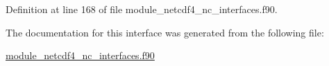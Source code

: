Definition at line 168 of file module\+\_\+netcdf4\+\_\+nc\+\_\+interfaces.\+f90.



The documentation for this interface was generated from the following file\+:\begin{DoxyCompactItemize}
\item 
\hyperlink{module__netcdf4__nc__interfaces_8f90}{module\+\_\+netcdf4\+\_\+nc\+\_\+interfaces.\+f90}\end{DoxyCompactItemize}
